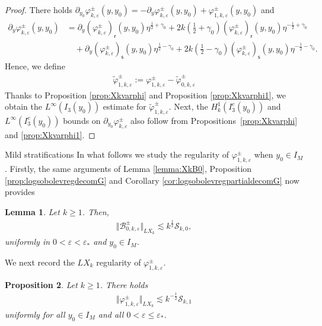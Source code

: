 \documentclass[11pt,reqno]{amsproc}
\makeatletter
\renewcommand\subsubsection{\@startsection{subsubsection}{3}%
\normalparindent{.5\linespacing\@plus.7\linespacing}{-.5em}
{\normalfont\bfseries}}
\newtheorem{proposition}{Proposition}[section]
\newtheorem{lemma}[proposition]{Lemma}
\theoremstyle{definition}
\numberwithin{equation}{section}
\newcommand{\B}{{\mathcal{B}}}
\newcommand{\sr}{{\mathsf{r}}}
\newcommand{\s}{{\mathsf{s}}}
\newcommand{\cS}{{\mathcal S}}
\newcommand{\ep}{\varepsilon}
\makeatother
\begin{document}
\begin{proof}
There holds $\partial_{y_0}\varphi_{k,\ep}^\pm(y,y_0) = -\partial_y\varphi_{k,\ep}^\pm(y,y_0) + \varphi_{1,k,\ep}^\pm(y,y_0)$ and
\begin{align*}
\partial_y\varphi_{k,\ep}^\pm(y,y_0) &=  \partial_y \left(\varphi_{k,\ep}^\pm \right)_\sr(y,y_0)\eta^{\frac12+\gamma_0} + 2k\left( \frac12 +\gamma_0\right) \left(\varphi_{k,\ep}^\pm \right)_\sr(y,y_0) \eta^{-\frac12+\gamma_0} \\
&\quad+ \partial_y \left(\varphi_{k,\ep}^\pm \right)_\s(y,y_0)\eta^{\frac12-\gamma_0} + 2k\left( \frac12 -\gamma_0\right) \left(\varphi_{k,\ep}^\pm \right)_\s(y,y_0)  \eta^{-\frac12-\gamma_0}.
\end{align*}
Hence, we define
\begin{align*}
\widetilde\varphi_{1,k,\ep}^\pm := \varphi_{1,k,\ep}^\pm - \widetilde\varphi_{0,k,\ep}^\pm
\end{align*}
Thanks to Proposition \ref{prop:Xkvarphi} and Proposition \ref{prop:Xkvarphi1}, we obtain the $L^\infty(I_3(y_0))$ estimate for $\widetilde\varphi_{1,k,\ep}^\pm$. Next, the $H_{k}^1(I_3^c(y_0))$ and $L^\infty(I_3^c(y_0))$ bounds on $\partial_{y_0}\varphi_{k,\ep}^\pm$ also follow from Propositions~\ref{prop:Xkvarphi} and \ref{prop:Xkvarphi1}.
\end{proof}

\subsubsection{Mild stratifications}
In what follows we study the regularity of $\varphi_{1,k,\ep}^\pm$ when $y_0\in I_M$. Firstly, the same arguments of Lemma \ref{lemma:XkB0}, Proposition \ref{prop:logsobolevregdecomG} and Corollary \ref{cor:logsobolevregpartialdecomG} now provides
\begin{lemma}\label{lemma:LXkB0}
Let $k\geq 1$. Then,  
\begin{align*}
\Vert \B_{0,k,\ep}^\pm \Vert_{LX_k}\lesssim k^\frac12\cS_{k,0},
\end{align*}
uniformly in $0<\ep<\ep_*$ and $y_0\in I_M$.
\end{lemma}

We next record the $LX_k$ regularity of $\varphi_{1,k,\ep}^\pm$.

\begin{proposition}\label{prop:LXkvarphi1}
Let $k\geq 1$. There holds 
\begin{align*}
\Vert \varphi_{1,k,\ep}^\pm \Vert_{LX_k} \lesssim k^{-\frac12}\cS_{k,1}
\end{align*}
uniformly for all $y_0\in I_M$ and all $0 < \ep\leq \ep_*$. 
\end{proposition}
\end{document}
